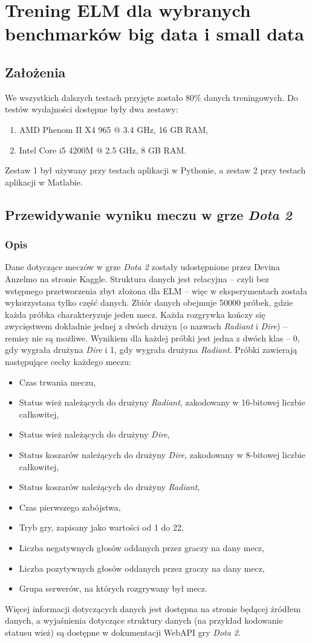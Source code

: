 \documentclass{article}
\begin{document}
\section{Trening ELM dla wybranych benchmarków big data i small data}
\subsection{Założenia}
We wszystkich dalszych testach przyjęte zostało 80\% danych treningowych. Do testów wydajności dostępne były dwa zestawy:
\begin{enumerate}
\item AMD Phenom II X4 965 @ 3.4 GHz, 16 GB RAM,
\item Intel Core i5 4200M @ 2.5 GHz, 8 GB RAM.
\end{enumerate}
Zestaw 1 był używany przy testach aplikacji w Pythonie, a zestaw 2 przy testach aplikacji w Matlabie.
\subsection{Przewidywanie wyniku meczu w grze \textit{Dota 2}}
\subsubsection{Opis}
Dane dotyczące meczów w grze \textit{Dota 2} zostały udostępnione przez Devina Anzelmo na stronie Kaggle. Struktura danych jest relacyjna -- czyli bez wstępnego przetworzenia zbyt złożona dla ELM -- więc w eksperymentach została wykorzystana tylko część danych. Zbiór danych obejmuje 50000 próbek, gdzie każda próbka charakteryzuje jeden mecz. Każda rozgrywka kończy się zwycięstwem dokładnie jednej z dwóch drużyn (o nazwach \textit{Radiant} i \textit{Dire}) -- remisy nie są możliwe. Wynikiem dla każdej próbki jest jedna z dwóch klas -- 0, gdy wygrała drużyna \textit{Dire} i 1, gdy wygrała drużyna \textit{Radiant}. Próbki zawierają następujące cechy każdego meczu:
\begin{itemize}
\item Czas trwania meczu,
\item Status wież należących do drużyny \textit{Radiant}, zakodowany w 16-bitowej liczbie całkowitej,
\item Status wież należących do drużyny \textit{Dire},
\item Status koszarów należących do drużyny \textit{Dire}, zakodowany w 8-bitowej liczbie całkowitej,
\item Status koszarów należących do drużyny \textit{Radiant},
\item Czas pierwszego zabójstwa,
\item Tryb gry, zapisany jako wartości od 1 do 22,
\item Liczba negatywnych głosów oddanych przez graczy na dany mecz,
\item Liczba pozytywnych głosów oddanych przez graczy na dany mecz,
\item Grupa serwerów, na których rozgrywany był mecz.
\end{itemize}
Więcej informacji dotyczących danych jest dostępna na stronie będącej źródłem danych, a wyjaśnienia dotyczące struktury danych (na przykład kodowanie statusu wież) są dostępne w dokumentacji WebAPI gry \textit{Dota 2}.
\end{document}
